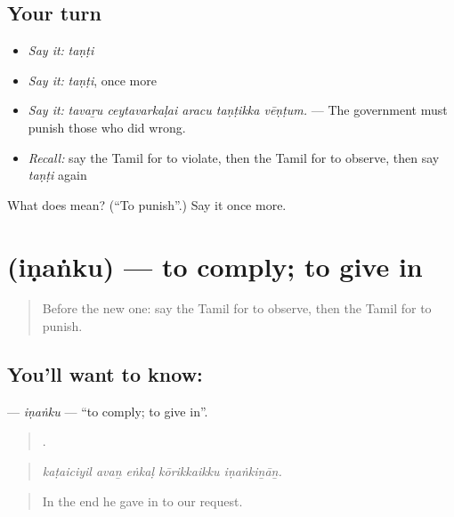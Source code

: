\subsection*{Your turn}
\begin{itemize}
\raggedright
  \item \emph{Say it:} \emph{taṇṭi}
  \item \emph{Say it:} \emph{taṇṭi}, once more
  \item \emph{Say it:} \emph{tavaṟu ceytavarkaḷai aracu taṇṭikka vēṇṭum.} — The government must punish those who did wrong.
  \item \emph{Recall:} say the Tamil for to violate, then the Tamil for to observe, then say \emph{taṇṭi} again
\end{itemize}

\begin{tcolorbox}[breakable,colback=teal!4,colframe=teal!35!black,title={Before you move on}]
What does  mean? (\textquotedblleft{}To punish\textquotedblright{}.) Say it once more.
\end{tcolorbox}
\section[\texorpdfstring{\ta{இணங்கு} (iṇaṅku)}{இணங்கு (iṇaṅku)}]{ (iṇaṅku) — to comply; to give in}

\label{lesson:TA-C372-inanku}



\begin{quote}
Before the new one: say the Tamil for to observe, then the Tamil for to punish.
\end{quote}

\subsection*{You'll want to know: }
\textbf{} — \emph{iṇaṅku} — \textquotedblleft{}to comply; to give in\textquotedblright{}.

\begin{quote}
    .
\end{quote}

\begin{quote}
\emph{kaṭaiciyil avaṉ eṅkaḷ kōrikkaikku iṇaṅkiṉāṉ.}
\end{quote}

\begin{quote}
In the end he gave in to our request.
\end{quote}

